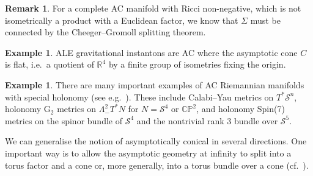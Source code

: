 \documentclass{article}
\theoremstyle{definition}
\newtheorem{rmk}[thm]{Remark}
\newtheorem{eg}[thm]{Example}
\numberwithin{thm}{section}
\numberwithin{equation}{section}
\DeclareMathOperator\vol{vol}
\def\R{\mathbb{R}}
\begin{document}

\begin{rmk}
For a complete AC manifold with Ricci non-negative, which is not isometrically a product with a Euclidean factor, we know that $\Sigma$ must be connected by the Cheeger--Gromoll splitting theorem.
\end{rmk}

\begin{eg}\label{eg:ALE}
    ALE gravitational instantons are AC where the asymptotic cone $C$ is flat, i.e.~a quotient of $\R^4$ by a finite group of isometries fixing the origin.
\end{eg}

\begin{eg} There are many important examples of AC Riemannian manifolds with special holonomy (see e.g.~\cite{BryantSalamon,ConlonHein,FHN2,Lehmann}). These include Calabi--Yau metrics on $T^*\mathcal{S}^n$,  holonomy $\mathrm{G}_2$ metrics  on $\Lambda^2_-T^*N$ for $N=\mathcal{S}^4$ or $\mathbb{CP}^2$, and holonomy Spin(7) metrics on the spinor bundle of $\mathcal{S}^4$ and the nontrivial rank $3$ bundle over $\mathcal{S}^5$.
\end{eg}

We can generalise the notion of asymptotically conical in several directions.  One important way is to allow the asymptotic geometry at infinity to split into a torus factor and a cone or, more generally, into a torus bundle over a cone (cf.~\cite{Cavalleri}).   
\end{document}
